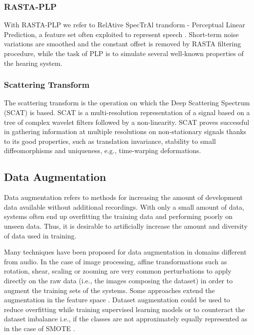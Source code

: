 \subsubsection{RASTA-PLP}
With RASTA-PLP we refer to RelAtive SpecTrAl transform - Perceptual Linear Prediction, a feature set often exploited to represent speech \cite{hermansky1994rasta}.
Short-term noise variations are smoothed and the constant offset is removed by RASTA filtering procedure, while the task of PLP is to simulate several well-known properties of the hearing system.

\subsubsection{Scattering Transform}

The scattering transform \cite{Mallat2012} is the operation on which the Deep Scattering Spectrum (SCAT) is based. SCAT is a multi-resolution representation of a signal based on a tree of complex wavelet filters followed by a non-linearity. SCAT proves successful in gathering information at multiple resolutions on non-stationary signals thanks to its good properties, such as translation invariance, stability to small diffeomorphisms and uniqueness, e.g., time-warping deformations.


\subsection{Data Augmentation}
Data augmentation refers to methods for increasing the amount of development data
available without additional recordings. With only a small amount of data, systems
often end up overfitting the training data and performing poorly on unseen data.
Thus, it is desirable to artificially increase the amount and diversity of data used in
training. 

Many techniques have been proposed for data augmentation in domains different from audio. In the case of image processing, affine transformations such as rotation, shear, scaling or zooming are very common perturbations to apply directly on the raw data (i.e., the images composing the dataset) in order to augment the training sets of the systems. Some approaches extend the augmentation in the feature space \cite{li2014learning}.
Dataset augmentation could be used to reduce overfitting while training supervised learning models or to counteract the dataset imbalance i.e., if the classes are not approximately equally represented as in the case of SMOTE \cite{chawla2002smote, han2005borderline}. 

